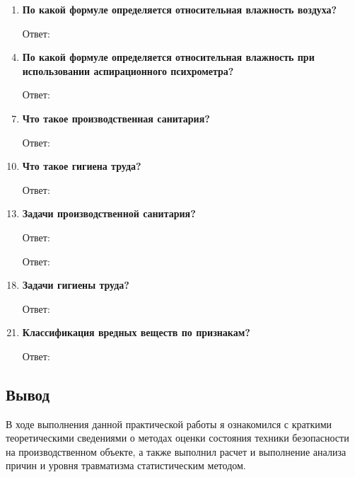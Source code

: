\documentclass[a5paper, 12dd, twoside]{article}
\begin{document}
\begin{enumerate}
    \item {\bfseries По какой формуле определяется относительная влажность воздуха?}
    \item [Ответ:]
    \item []
    \item {\bfseries По какой формуле определяется относительная влажность при использовании аспирационного психрометра?}
    \item [Ответ:]
    \item []
    \item {\bfseries Что такое производственная санитария?}
    \item [Ответ:]
    \item []
    \item {\bfseries Что такое гигиена труда?}
    \item [Ответ:]
    \item []
    \item {\bfseries Задачи производственной санитария?}
    \item [Ответ:]
    \item []
    \item [Ответ:]
    \item []
    \item {\bfseries Задачи гигиены труда?}
    \item [Ответ:]
    \item []
    \item {\bfseries Классификация вредных веществ по признакам?}
    \item [Ответ:]
    \item []
\end{enumerate}


\subsection*{Вывод}
В ходе выполнения данной практической работы я ознакомился с краткими теоретическими сведениями о методах оценки состояния техники безопасности на производственном объекте, а также выполнил расчет и выполнение анализа причин и уровня травматизма статистическим методом.
\end{document}
